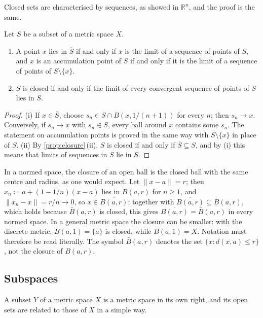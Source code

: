 Closed sets are characterised by sequences, as  showed in $\mathbb R^n$, and the proof is the same.

\begin{proposition}
\label{prop:closure-sequences}
Let $S$ be a subset of a metric space $X$.
\begin{enumerate}
\item A point $x$ lies in $\overline S$ if and only if $x$ is the limit of a sequence of points of $S$, and $x$ is an accumulation point of $S$ if and only if it is the limit of a sequence of points of $S\setminus\{x\}$.
\item $S$ is closed if and only if the limit of every convergent sequence of points of $S$ lies in $S$.
\end{enumerate}
\end{proposition}

\begin{proof}
(i) If $x\in\overline S$, choose $s_n\in S\cap B(x,1/(n+1))$ for every $n$; then $s_n\to x$. Conversely, if $s_n\to x$ with $s_n\in S$, every ball around $x$ contains some $s_n$. The statement on accumulation points is proved in the same way with $S\setminus\{x\}$ in place of $S$. (ii) By \cref{prop:closure}\,(ii), $S$ is closed if and only if $\overline S\subseteq S$, and by (i) this means that limits of sequences in $S$ lie in $S$.
\end{proof}

In a normed space, the closure of an open ball is the closed ball with the same centre and radius, as one would expect. Let $\|x-a\|=r$; then $x_n\coloneqq a+(1-1/n)(x-a)$ lies in $B(a,r)$ for $n\ge1$, and $\|x_n-x\|=r/n\to0$, so $x\in\overline{B(a,r)}$; together with $\overline{B(a,r)}\subseteq\bar B(a,r)$, which holds because $\bar B(a,r)$ is closed, this gives $\overline{B(a,r)}=\bar B(a,r)$ in every normed space. In a general metric space the closure can be smaller: with the discrete metric, $B(a,1)=\{a\}$ is closed, while $\bar B(a,1)=X$. Notation must therefore be read literally. The symbol $\bar B(a,r)$ denotes the set $\{x: d(x,a)\le r\}$, not the closure of $B(a,r)$.

\subsection{Subspaces}

A subset $Y$ of a metric space $X$ is a metric space in its own right, and its open sets are related to those of $X$ in a simple way.

